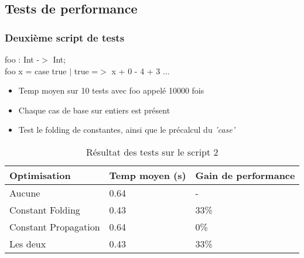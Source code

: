 \documentclass{beamer}
\begin{document}
\subsection{Tests de performance}
\begin{frame}
    \frametitle{Deuxième script de tests}
    foo : Int -$>$ Int;\\
    foo x = case true
        $|$ true =$>$ x + 0 - 4 + 3 ...\\
    \bigskip
    \begin{itemize}
      \item Temp moyen sur 10 tests avec foo appelé 10000 fois
      \item Chaque cas de base sur entiers est présent
      \item Test le folding de constantes, ainsi que le précalcul du \emph{'case'}
    \end{itemize}

    \begin{table}
      \begin{tabular}{l l l}
        \toprule
        \textbf{Optimisation} & \textbf{Temp moyen (s)} & \textbf{Gain de performance}\\
        \midrule
        Aucune & 0.64 & - \\
        Constant Folding & 0.43 & 33\% \\
        Constant Propagation & 0.64 & 0\% \\
        Les deux & 0.43 & 33\% \\
        \bottomrule
      \end{tabular}
      \caption{Résultat des tests sur le script 2}
    \end{table}
\end{frame}
\end{document}
